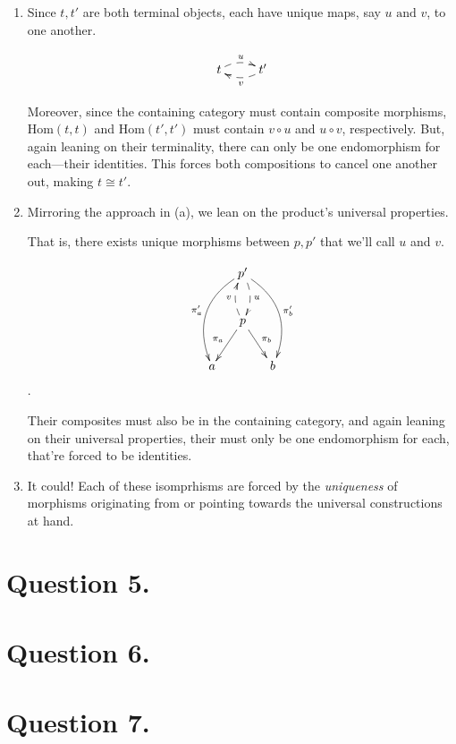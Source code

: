 \documentclass{article}
\begin{document}
\begin{enumerate}[label=(\alph*)]

\item Since $t, t'$ are both terminal objects, each have unique maps, say $u \textrm{ and } v$, to one another.

\[\xymatrix{t \ar@{-->}@/^/[r]^{u} & t' \ar@{-->}@/^/[l]^{v}}\]

Moreover, since the containing category must contain composite morphisms, $\textrm{Hom}(t, t)$ and $\textrm{Hom}(t', t')$ must contain $v \circ u$ and $u \circ v$, respectively. But, again leaning on their terminality, there can only be one endomorphism for each—their identities. This forces both compositions to cancel one another out, making $t \cong t'$.

\item Mirroring the approach in (a), we lean on the product’s universal properties.

That is, there exists unique morphisms between $p, p'$ that we’ll call $u$ and $v$.

\[
\xymatrix
@C=1pc
{
	  & p' \ar@{-->}@/^/[d]^{u} \ar@/_1.5pc/[ddl]_{\pi_a'} \ar@/^1.5pc/[ddr]^{\pi_b'} \\
	  & p \ar@{-->}@/^/[u]^{v} \ar[dl]_{\pi_a} \ar[dr]^{\pi_b} & \\
	a & & b
}
\].

Their composites must also be in the containing category, and again leaning on their universal properties, their must only be one endomorphism for each, that’re forced to be identities.

\item It could! Each of these isomprhisms are forced by the \textit{uniqueness} of morphisms originating from or pointing towards the universal constructions at hand.

\end{enumerate}

\section*{Question 5.}

\section*{Question 6.}

\section*{Question 7.}
\end{document}
